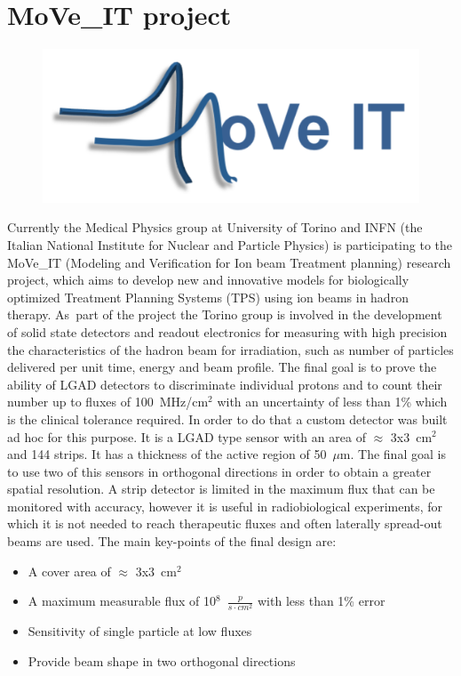 \section{MoVe\_IT project}\label{moveit}
\begin{figure}[H]
	\centering
	\includegraphics[width=0.35\linewidth]{IMG/ch2/Move_IT_logo}
\end{figure}
\noindent Currently the Medical Physics group at University of Torino and INFN (the Italian National Institute for
Nuclear and Particle Physics) is participating to the MoVe\_IT\cite{moveit} (Modeling and Verification for Ion beam Treatment planning)
research project, which aims to develop new and
innovative models for biologically optimized Treatment Planning Systems (TPS) using ion beams in hadron therapy.
As~part of the project the Torino group is involved in the development of solid state detectors and readout electronics for measuring with high precision
the characteristics of the hadron beam for irradiation, such as number of particles delivered per unit time, energy and beam profile.
The final goal is to prove the ability of LGAD detectors to discriminate individual protons and to count their number up to fluxes of 100~MHz/cm$^2$ with an uncertainty of less than 1\% which is the clinical tolerance required.
In order to do that a custom detector was built ad hoc for this purpose. It is a LGAD type sensor with an area of $\approx$ 3x3~cm$^2$ and 144 strips. It has a thickness of the active region of 50~$\mu$m.
The final goal is to use two of this sensors in orthogonal directions in order to obtain a greater spatial resolution.
A strip detector is limited in the maximum flux that can be monitored with accuracy, however it is useful in radiobiological experiments, for which it is not needed to reach therapeutic fluxes and often laterally spread-out beams are used\cite{hammad}.
The main key-points of the final design are:
\begin{itemize}
	\item A cover area of $\approx$ 3x3~cm$^2$
	\item A maximum measurable flux of 10$^8$~$\frac{p}{s \cdot cm^2}$ with less than 1\% error
	\item Sensitivity of single particle at low fluxes
	\item Provide beam shape in two orthogonal directions
\end{itemize}


